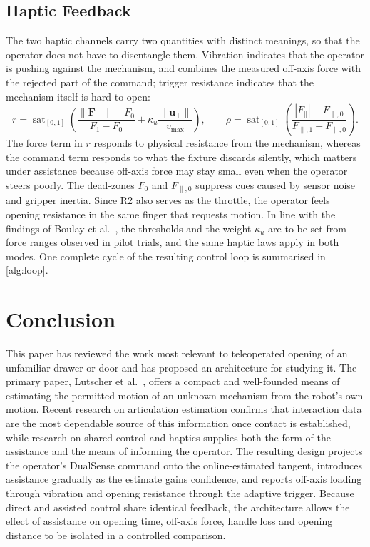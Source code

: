 \documentclass[11pt,letterpaper]{article}
\newcommand{\vect}[1]{\bm{#1}}
\newcommand{\vuser}{\vect{u}}
\newcommand{\Fperp}{\vect{F}_{\perp}}
\newcommand{\Fpar}{F_{\parallel}}
\DeclareMathOperator{\sat}{sat}
\begin{document}
\subsection{Haptic Feedback}
\label{sec:haptics}

The two haptic channels carry two quantities with distinct meanings, so that the operator does not have to disentangle them. Vibration indicates that the operator is pushing against the mechanism, and combines the measured off-axis force with the rejected part of the command; trigger resistance indicates that the mechanism itself is hard to open:
\begin{equation}
  r = \sat_{[0,1]}\!\left(\frac{\lVert\Fperp\rVert-F_0}{F_1-F_0} + \kappa_u\frac{\lVert\vuser_\perp\rVert}{v_{\max}}\right),
  \qquad
  \rho = \sat_{[0,1]}\!\left(\frac{|\Fpar|-F_{\parallel,0}}{F_{\parallel,1}-F_{\parallel,0}}\right).
  \label{eq:haptic}
\end{equation}
The force term in $r$ responds to physical resistance from the mechanism, whereas the command term responds to what the fixture discards silently, which matters under assistance because off-axis force may stay small even when the operator steers poorly. The dead-zones $F_0$ and $F_{\parallel,0}$ suppress cues caused by sensor noise and gripper inertia. Since R2 also serves as the throttle, the operator feels opening resistance in the same finger that requests motion. In line with the findings of Boulay et al.\ \cite{boulay2026selecting}, the thresholds and the weight $\kappa_u$ are to be set from force ranges observed in pilot trials, and the same haptic laws apply in both modes. One complete cycle of the resulting control loop is summarised in \cref{alg:loop}.



\section{Conclusion}
\label{sec:conclusion}

This paper has reviewed the work most relevant to teleoperated opening of an unfamiliar drawer or door and has proposed an architecture for studying it. The primary paper, Lutscher et al.\ \cite{lutscher2010control}, offers a compact and well-founded means of estimating the permitted motion of an unknown mechanism from the robot's own motion. Recent research on articulation estimation confirms that interaction data are the most dependable source of this information once contact is established, while research on shared control and haptics supplies both the form of the assistance and the means of informing the operator. The resulting design projects the operator's DualSense command onto the online-estimated tangent, introduces assistance gradually as the estimate gains confidence, and reports off-axis loading through vibration and opening resistance through the adaptive trigger. Because direct and assisted control share identical feedback, the architecture allows the effect of assistance on opening time, off-axis force, handle loss and opening distance to be isolated in a controlled comparison.

\printbibliography[heading=bibintoc,title={References}]
\end{document}

